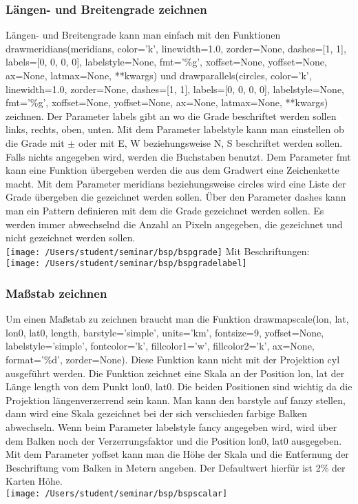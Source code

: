  \subsubsection*{Längen- und Breitengrade zeichnen}
 Längen- und Breitengrade kann man einfach mit den Funktionen \textsf{drawmeridians(meridians, color='k', linewidth=1.0, zorder=None, dashes=[1, 1], labels=[0, 0, 0, 0], labelstyle=None, fmt='\%g', xoffset=None, yoffset=None, ax=None, latmax=None, **kwargs)} und \textsf{drawparallels(circles, color='k', linewidth=1.0, zorder=None, dashes=[1, 1], labels=[0, 0, 0, 0], labelstyle=None, fmt='\%g', xoffset=None, yoffset=None, ax=None, latmax=None, **kwargs)} zeichnen. Der Parameter \textsf{labels} gibt an wo die Grade beschriftet werden sollen links, rechts, oben, unten. Mit dem Parameter \textsf{labelstyle} kann man einstellen ob die Grade mit $ \pm $ oder mit E, W beziehungsweise N, S beschriftet werden sollen. Falls nichts angegeben wird, werden die Buchstaben benutzt. Dem Parameter \textsf{fmt} kann eine Funktion übergeben werden die aus dem Gradwert eine Zeichenkette macht.
 Mit dem Parameter \textsf{meridians} beziehungsweise \textsf{circles} wird eine Liste der Grade übergeben die gezeichnet werden sollen. Über den Parameter \textsf{dashes} kann man ein Pattern definieren mit dem die Grade gezeichnet werden sollen. Es werden immer abwechselnd die Anzahl an Pixeln angegeben, die gezeichnet und nicht gezeichnet werden sollen.\\
 
 \texttt{[image: /Users/student/seminar/bsp/bspgrade]}
 Mit Beschriftungen:\\
  
  \texttt{[image: /Users/student/seminar/bsp/bspgradelabel]}\newpage 
 \subsubsection*{Maßstab zeichnen}
 Um einen Maßstab zu zeichnen braucht man die Funktion \textsf{drawmapscale(lon, lat, lon0, lat0, length, barstyle='simple', units='km', fontsize=9, yoffset=None, labelstyle='simple', fontcolor='k', fillcolor1='w', fillcolor2='k', ax=None, format='\%d', zorder=None)}. Diese Funktion kann nicht mit der Projektion \textsf{cyl} ausgeführt werden. Die Funktion zeichnet eine Skala an der Position \textsf{lon, lat} der Länge \textsf{length} von dem Punkt \textsf{lon0, lat0}. Die beiden Positionen sind wichtig da die Projektion längenverzerrend sein kann. Man kann den \textsf{barstyle} auf \textsf{fanzy} stellen, dann wird eine Skala gezeichnet bei der sich verschieden farbige Balken abwechseln. Wenn beim Parameter \textsf{labelstyle fancy} angegeben wird, wird über dem Balken noch der Verzerrungsfaktor und die Position \textsf{lon0, lat0} ausgegeben. Mit dem Parameter \textsf{yoffset} kann man die Höhe der Skala und die Entfernung der Beschriftung vom Balken in Metern angeben. Der Defaultwert hierfür ist 2\% der Karten Höhe.\\
 
 \texttt{[image: /Users/student/seminar/bsp/bspscalar]}\newpage 
